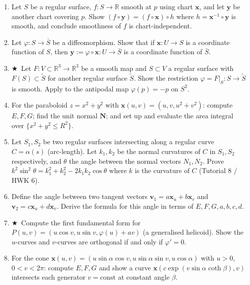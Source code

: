 \documentclass[11pt, a4paper]{article}
\newcommand{\R}{\mathbb{R}}
\newcommand{\hard}{$\bigstar$\ }
\begin{document}
\begin{enumerate}[label=\textbf{Q\arabic*.}, leftmargin=*, itemsep=6pt]
\item Let $S$ be a regular surface, $f:S\to\R$ smooth at $p$ using chart $\mathbf{x}$, and let $\mathbf{y}$ be another chart covering $p$. Show $(f\circ\mathbf{y})=(f\circ\mathbf{x})\circ h$ where $h=\mathbf{x}^{-1}\circ\mathbf{y}$ is smooth, and conclude smoothness of $f$ is chart-independent.

\item Let $\varphi:S\to\bar{S}$ be a diffeomorphism. Show that if $\mathbf{x}:U\to S$ is a coordinate function of $S$, then $\mathbf{y}:=\varphi\circ\mathbf{x}:U\to\bar{S}$ is a coordinate function of $\bar{S}$.

\item \hard Let $F:V\subset\R^3\to\R^3$ be a smooth map and $S\subset V$ a regular surface with $F(S)\subset\tilde{S}$ for another regular surface $\tilde{S}$. Show the restriction $\varphi=F|_S:S\to\tilde{S}$ is smooth. Apply to the antipodal map $\varphi(p)=-p$ on $S^2$.

\item For the paraboloid $z=x^2+y^2$ with $\mathbf{x}(u,v)=(u,v,u^2+v^2)$: compute $E,F,G$; find the unit normal $\mathbf{N}$; and set up and evaluate the area integral over $\{x^2+y^2\leq R^2\}$.

\item Let $S_1,S_2$ be two regular surfaces intersecting along a regular curve $C=\alpha(s)$ (arc-length). Let $k_1,k_2$ be the normal curvatures of $C$ in $S_1,S_2$ respectively, and $\theta$ the angle between the normal vectors $N_1,N_2$. Prove $k^2\sin^2\theta=k_1^2+k_2^2-2k_1k_2\cos\theta$ where $k$ is the curvature of $C$ (Tutorial 8 / HWK 6).

\item Define the angle between two tangent vectors $\mathbf{v}_1=a\mathbf{x}_u+b\mathbf{x}_v$ and $\mathbf{v}_2=c\mathbf{x}_u+d\mathbf{x}_v$. Derive the formula for this angle in terms of $E,F,G,a,b,c,d$.

\item \hard Compute the first fundamental form for $P(u,v)=(u\cos v, u\sin v, \varphi(u)+av)$ (a generalised helicoid). Show the $u$-curves and $v$-curves are orthogonal if and only if $\varphi'=0$.

\item For the cone $\mathbf{x}(u,v)=(u\sin\alpha\cos v, u\sin\alpha\sin v, u\cos\alpha)$ with $u>0$, $0<v<2\pi$: compute $E,F,G$ and show a curve $\mathbf{x}(c\exp(v\sin\alpha\coth\beta),v)$ intersects each generator $v=\text{const}$ at constant angle $\beta$.


\end{enumerate}
\end{document}
